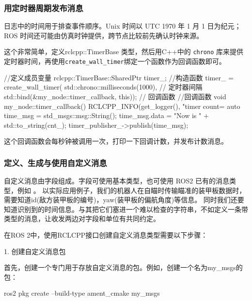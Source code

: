 \subsubsection{用定时器周期发布消息}
\begin{note}
日志中的时间用于排查事件顺序。Unix 时间以 UTC 1970 年 1 月 1 日为纪元；ROS 时间还可能由仿真时钟提供，跨节点比较前先确认时钟来源。
\end{note}
这个非常简单，定义rclcpp::TimerBase 类型，然后用C++中的 \texttt{chrono} 库来提供定时器时间，再使用\texttt{create\_wall\_timer}绑定一个函数作为回调函数即可。
\par\medskip\noindent\begin{minipage}{\linewidth}
\begin{tcode}
    //定义成员变量
    rclcpp::TimerBase::SharedPtr timer_;
    //构造函数
    timer_ = create_wall_timer(
        std::chrono::milliseconds(1000), // 定时器间隔
        std::bind(&my_node::timer_callback, this)); // 回调函数
    //回调函数
    void my_node::timer_callback()
    {
        RCLCPP_INFO(get_logger(), "timer count=%
        auto time_msg = std_msgs::msg::String();
        time_msg.data = "Now is " + std::to_string(cnt_);
        timer_publisher_->publish(time_msg);
    }
\end{tcode}
\end{minipage}\par\smallskip
这个回调函数会每秒钟被调用一次，打印一下回调计数，并发布计数消息。

\subsubsection{定义、生成与使用自定义消息}
自定义消息由字段组成。字段可使用基本类型，也可使用 ROS2 已有的消息类型，例如 。
以实际应用例子，我们的机器人在自瞄时传输瞄准的装甲板数据时，需要知道id(敌方装甲板的编号)，yaw(装甲板的偏航角度)等信息。
同时我们还要知道识别到的时间信息。与其把它们塞进一个难以检查的字符串，不如定义一条带类型的消息，让收发两边对字段和单位有共同约定。


在ROS 2中，使用RCLCPP接口创建自定义消息类型需要以下步骤：

1. 创建自定义消息包

首先，创建一个专门用于存放自定义消息的包。例如，创建一个名为my\_msgs的包：
\par\medskip\noindent\begin{minipage}{\linewidth}
\begin{tbash}
    ros2 pkg create --build-type ament_cmake my_msgs
\end{tbash}
\end{minipage}\par\smallskip

